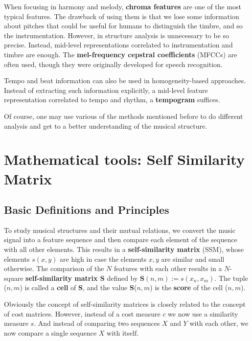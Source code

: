 \documentclass[a4paper, 9pt, twocolumn]{extarticle}
\begin{document}
When focusing in harmony and melody, \textbf{chroma features} are one of the most typical features. The drawback of using them is that we lose some information about pitches that could be useful for humans to distinguish the timbre, and so the instrumentation. However, in structure analysis is unnecessary to be so precise. Instead, mid-level representations correlated to instrumentation and timbre are enough. The \textbf{mel-frequency cepstral coefficients} (MFCCs) are often used, though they were originally developed for speech recognition.

Tempo and beat information can also be used in homogeneity-based approaches. Instead of extracting such information explicitly, a mid-level feature representation correlated to tempo and rhythm, a \textbf{tempogram} suffices.

Of course, one may use various of the methods mentioned before to do different analysis and get to a better understanding of the musical structure.

\section{Mathematical tools: Self Similarity Matrix}
\label{section:ssm}
\subsection{Basic Definitions and Principles}
\label{subsection:ssmBasic}

To study musical structures and their mutual relations, we convert the music signal into a feature sequence and then compare each element of the sequence with all other elements. This results in a \textbf{self-similarity matrix} (SSM), whose elements $s(x,y)$ are high in case the elements $x,y$ are similar and small otherwise. The comparison of the $N$ features with each other results in a $N$-square \textbf{self-similarity matrix S} defined by $\textbf{S}(n,m):=s(x_{n}, x_{m})$. The tuple ($n,m$) is called a \textbf{cell} of \textbf{S}, and the value \textbf{S}($n,m$) is the \textbf{score} of the cell ($n,m$).

Obviously the concept of self-similarity matrices is closely related to the concept of cost matrices. However, instead of a cost measure $c$ we now use a similarity measure $s$. And
instead of comparing two sequences $X$ and $Y$ with each other, we now compare a single sequence $X$ with itself.
\end{document}
